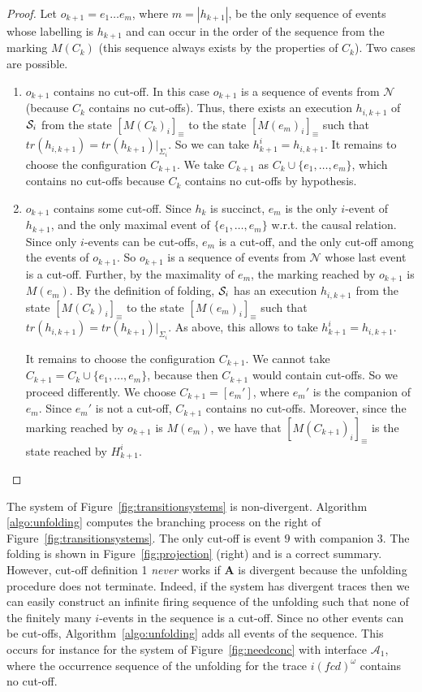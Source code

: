 \documentclass{llncs}
\def\A{\mathcal{A}}
\def\prod{\mathbf{A}}
\def\N{\mathcal{N}}
\def\S{\mathcal{S}}
\newcommand{\ma}[1]{M(#1)}
\renewcommand{\S}{{\cal S}}
\def\trace{tr}
\begin{document}
\begin{proof}
Let $o_{k+1}=e_1 \dots e_m$, where $m = |h_{k+1}|$,  be the only sequence of events 
whose labelling is $h_{k+1}$ and can occur in the order of the sequence from the marking $\ma{C_k}$ 
(this sequence always exists by the properties of $C_k$). 
Two cases are possible.
\begin{enumerate}
\item $o_{k+1}$ contains no cut-off.
In this case $o_{k+1}$ is a sequence of events from $\N$ (because $C_k$ contains no cut-offs). 
Thus, there exists an execution $h_{i,k+1}$ of $\S_i$ from the state $[\ma{C_k}_i]_\equiv$ 
to the state $[\ma{e_{m}}_i]_\equiv$ such that $\trace(h_{i,k+1})=\trace(h_{k+1})|_{\Sigma_i}$.
So we can take $h^i_{k+1}=h_{i,k+1}$.
It remains to choose the configuration $C_{k+1}$. We take $C_{k+1}$ as $C_k \cup \{e_1, \ldots, e_m\}$,
which contains no cut-offs because $C_k$ contains no cut-offs by hypothesis.
\item $o_{k+1}$ contains some cut-off.
Since $h_k$ is succinct, $e_m$ is the only $i$-event of $h_{k+1}$, and the only
maximal event of $\{e_1, \ldots, e_m\}$ w.r.t. the causal relation. Since
only $i$-events can be cut-offs, $e_m$ is a cut-off, and the only cut-off among the events of
$o_{k+1}$. So $o_{k+1}$ is a sequence of events from $\N$ whose last event is a cut-off.
Further, by the maximality of $e_m$, the marking reached by $o_{k+1}$ is $\ma{e_m}$.
By the definition of folding, $\S_i$ has an execution $h_{i,k+1}$ from the state 
$[\ma{C_{k}}_i]_\equiv$ to the state $[\ma{e_m}_i]_\equiv$ such that 
$\trace(h_{i,k+1})=\trace(h_{k+1})|_{\Sigma_i}$. As above, this allows to take $h^i_{k+1}=h_{i,k+1}$.

It remains to choose the configuration $C_{k+1}$. We cannot take 
$C_{k+1} = C_{k} \cup \{e_1, \ldots, e_m\}$, because then $C_{k+1}$ would contain cut-offs. 
So we proceed differently. We choose $C_{k+1}= [e_m']$, where $e_m'$ is the companion of $e_m$. 
Since $e_m'$ is not a cut-off, $C_{k+1}$ contains no cut-offs. Moreover, since the marking 
reached by $o_{k+1}$ is $\ma{e_m}$, we have that $[\ma{C_{k+1}}_i]_\equiv$ is the state reached by 
$H_{k+1}^i$.
\end{enumerate}
\end{proof}

The system of Figure~\ref{fig:transitionsystems} is non-divergent. 
Algorithm \ref{algo:unfolding} computes the branching process 
on the right of Figure~\ref{fig:transitionsystems}. The only cut-off is
event $9$ with companion $3$. The folding is shown in Figure~\ref{fig:projection} (right) and is a correct summary.
However, cut-off definition 1 {\em never} works if $\prod$ is divergent
because the unfolding procedure does not terminate. Indeed, if the system 
has divergent traces then we can easily construct an infinite firing sequence of the unfolding such that none of the finitely many $i$-events 
in the sequence is a cut-off. Since no other events can be cut-offs, Algorithm~\ref{algo:unfolding} adds all events of the sequence. This occurs for 
instance for the system of Figure~\ref{fig:needconc} with interface $\A_1$, where the occurrence sequence of the unfolding for the trace $\mathit{i}(\mathit{fcd})^\omega$ contains no cut-off.
\end{document}
